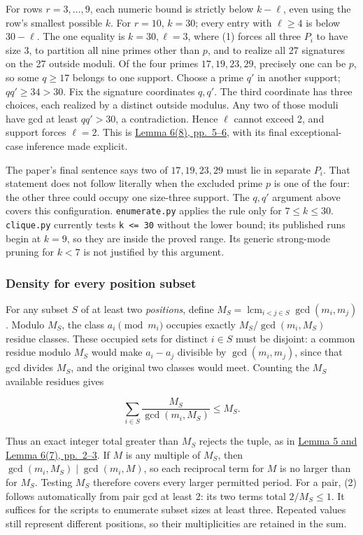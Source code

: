\documentclass[11pt,a4paper]{article}
\begin{document}
For rows \(r=3,\ldots,9\), each numeric bound is strictly below \(k-\ell\), even using the row's smallest possible \(k\). For \(r=10\), \(k=30\); every entry with \(\ell\ge4\) is below \(30-\ell\). The one equality is \(k=30,\ell=3\), where (1) forces all three \(P_i\) to have size 3, to partition all nine primes other than \(p\), and to realize all 27 signatures on the 27 outside moduli. Of the four primes \(17,19,23,29\), precisely one can be \(p\), so some \(q\ge17\) belongs to one support. Choose a prime \(q'\) in another support; \(qq'\ge34>30\). Fix the signature coordinates \(q,q'\). The third coordinate has three choices, each realized by a distinct outside modulus. Any two of those moduli have gcd at least \(qq'>30\), a contradiction. Hence \(\ell\) cannot exceed 2, and support forces \(\ell=2\). This is \href{https://arxiv.org/pdf/math/0604347v2}{Lemma 6(8), pp.~5--6}, with its final exceptional-case inference made explicit.

The paper's final sentence says two of \(17,19,23,29\) must lie in separate \(P_i\). That statement does not follow literally when the excluded prime \(p\) is one of the four: the other three could occupy one size-three support. The \(q,q'\) argument above covers this configuration. \texttt{enumerate.py} applies the rule only for \(7\le k\le30\). \texttt{clique.py} currently tests \texttt{k\ \textless{}=\ 30} without the lower bound; its published runs begin at \(k=9\), so they are inside the proved range. Its generic strong-mode pruning for \(k<7\) is not justified by this argument.

\subsubsection{Density for every position subset}\label{density-for-every-position-subset}

For any subset \(S\) of at least two \emph{positions}, define \(M_S=\operatorname{lcm}_{i<j\in S}\gcd(m_i,m_j)\). Modulo \(M_S\), the class \(a_i\pmod{m_i}\) occupies exactly \(M_S/\gcd(m_i,M_S)\) residue classes. These occupied sets for distinct \(i\in S\) must be disjoint: a common residue modulo \(M_S\) would make \(a_i-a_j\) divisible by \(\gcd(m_i,m_j)\), since that gcd divides \(M_S\), and the original two classes would meet. Counting the \(M_S\) available residues gives

\[
  \sum_{i\in S}\frac{M_S}{\gcd(m_i,M_S)}\le M_S. \tag{2}
\]

Thus an exact integer total greater than \(M_S\) rejects the tuple, as in \href{https://arxiv.org/pdf/math/0604347v2}{Lemma 5 and Lemma 6(7), pp.~2--3}. If \(M\) is any multiple of \(M_S\), then \(\gcd(m_i,M_S)\mid\gcd(m_i,M)\), so each reciprocal term for \(M\) is no larger than for \(M_S\). Testing \(M_S\) therefore covers every larger permitted period. For a pair, (2) follows automatically from pair gcd at least 2: its two terms total \(2/M_S\le1\). It suffices for the scripts to enumerate subset sizes at least three. Repeated values still represent different positions, so their multiplicities are retained in the sum.
\end{document}
